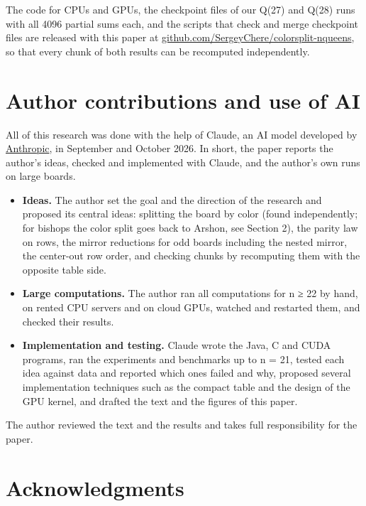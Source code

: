 The code for CPUs and GPUs, the checkpoint files of our Q(27) and Q(28) runs with all 4096 partial sums each, and the scripts that check and merge checkpoint files are released with this paper at \href{https://github.com/SergeyChere/colorsplit-nqueens}{github.com/SergeyChere/colorsplit-nqueens}, so that every chunk of both results can be recomputed independently.

\section{Author contributions and use of AI}

All of this research was done with the help of Claude, an AI model developed by \href{https://www.anthropic.com}{Anthropic}, in September and October 2026. In short, the paper reports the author's ideas, checked and implemented with Claude, and the author's own runs on large boards.

\begin{itemize}
\item{} \textbf{Ideas.} The author set the goal and the direction of the research and proposed its central ideas: splitting the board by color (found independently; for bishops the color split goes back to Arshon, see Section 2), the parity law on rows, the mirror reductions for odd boards including the nested mirror, the center-out row order, and checking chunks by recomputing them with the opposite table side.
\item{} \textbf{Large computations.} The author ran all computations for n ≥ 22 by hand, on rented CPU servers and on cloud GPUs, watched and restarted them, and checked their results.
\item{} \textbf{Implementation and testing.} Claude wrote the Java, C and CUDA programs, ran the experiments and benchmarks up to n = 21, tested each idea against data and reported which ones failed and why, proposed several implementation techniques such as the compact table and the design of the GPU kernel, and drafted the text and the figures of this paper.
\end{itemize}

The author reviewed the text and the results and takes full responsibility for the paper.

\section*{Acknowledgments}

